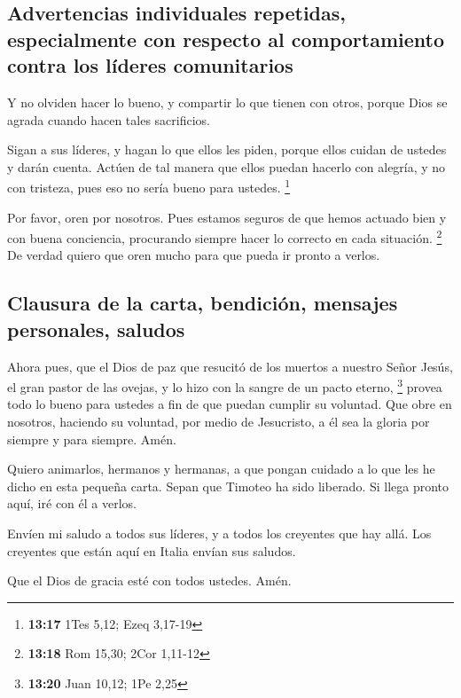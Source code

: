 \hypertarget{advertencias-individuales-repetidas-especialmente-con-respecto-al-comportamiento-contra-los-luxedderes-comunitarios}{%
\subsection{Advertencias individuales repetidas, especialmente con
respecto al comportamiento contra los líderes
comunitarios}\label{advertencias-individuales-repetidas-especialmente-con-respecto-al-comportamiento-contra-los-luxedderes-comunitarios}}

 Y no olviden hacer lo bueno, y compartir lo que tienen
con otros, porque Dios se agrada cuando hacen tales sacrificios.

 Sigan a sus líderes, y hagan lo que ellos les piden,
porque ellos cuidan de ustedes y darán cuenta. Actúen de tal manera que
ellos puedan hacerlo con alegría, y no con tristeza, pues eso no sería
bueno para ustedes. \footnote{\textbf{13:17} 1Tes 5,12; Ezeq 3,17-19}

 Por favor, oren por nosotros. Pues estamos seguros de
que hemos actuado bien y con buena conciencia, procurando siempre hacer
lo correcto en cada situación. \footnote{\textbf{13:18} Rom 15,30; 2Cor
  1,11-12}  De verdad quiero que oren mucho para que
pueda ir pronto a verlos.

\hypertarget{clausura-de-la-carta-bendiciuxf3n-mensajes-personales-saludos}{%
\subsection{Clausura de la carta, bendición, mensajes personales,
saludos}\label{clausura-de-la-carta-bendiciuxf3n-mensajes-personales-saludos}}

 Ahora pues, que el Dios de paz que resucitó de los
muertos a nuestro Señor Jesús, el gran pastor de las ovejas, y lo hizo
con la sangre de un pacto eterno, \footnote{\textbf{13:20} Juan 10,12;
  1Pe 2,25}  provea todo lo bueno para ustedes a fin de
que puedan cumplir su voluntad. Que obre en nosotros, haciendo su
voluntad, por medio de Jesucristo, a él sea la gloria por siempre y para
siempre. Amén.

 Quiero animarlos, hermanos y hermanas, a que pongan
cuidado a lo que les he dicho en esta pequeña carta. 
Sepan que Timoteo ha sido liberado. Si llega pronto aquí, iré con él a
verlos.

 Envíen mi saludo a todos sus líderes, y a todos los
creyentes que hay allá. Los creyentes que están aquí en Italia envían
sus saludos.

 Que el Dios de gracia esté con todos ustedes. Amén.
